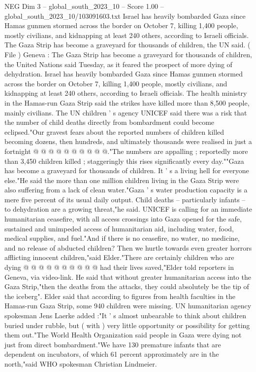 \begin{textsample}{NEG Dim 3 – global\_south\_2023\_10 – Score 1.00 – global\_south\_2023\_10/103091603.txt}  \label{ex:f3_neg_025}
Israel has heavily bombarded Gaza since Hamas gunmen stormed across the border on October 7, killing 1,400 people, mostly civilians, and kidnapping at least 240 others, according to Israeli officials.
The Gaza Strip has become a graveyard for thousands of children, the UN said. ( File ) Geneva : The Gaza Strip has become a graveyard for thousands of children, the United Nations said Tuesday, as it feared the prospect of more dying of dehydration.
Israel has heavily bombarded Gaza since Hamas gunmen stormed across the border on October 7, killing 1,400 people, mostly civilians, and kidnapping at least 240 others, according to Israeli officials.
The health ministry in the Hamas-run Gaza Strip said the strikes have killed more than 8,500 people, mainly civilians.
The UN children ' s agency UNICEF said there was a risk that the number of child deaths directly from bombardment could become eclipsed."Our gravest fears about the reported numbers of children killed becoming dozens, then hundreds, and ultimately thousands were realised in just a fortnight @ @ @ @ @ @ @ @ @ @."The numbers are appalling ; reportedly more than 3,450 children killed ; staggeringly this rises significantly every day.""Gaza has become a graveyard for thousands of children.
It ' s a living hell for everyone else."He said the more than one million children living in the Gaza Strip were also suffering from a lack of clean water."Gaza ' s water production capacity is a mere five percent of its usual daily output.
Child deaths -- particularly infants -- to dehydration are a growing threat,"he said.
UNICEF is calling for an immediate humanitarian ceasefire, with all access crossings into Gaza opened for the safe, sustained and unimpeded access of humanitarian aid, including water, food, medical supplies, and fuel."And if there is no ceasefire, no water, no medicine, and no release of abducted children?
Then we hurtle towards even greater horrors afflicting innocent children,"said Elder."There are certainly children who are dying @ @ @ @ @ @ @ @ @ @ had their lives saved,"Elder told reporters in Geneva, via video-link.
He said that without greater humanitarian access into the Gaza Strip,"then the deaths from the attacks, they could absolutely be the tip of the iceberg".
Elder said that according to figures from health faculties in the Hamas-run Gaza Strip, some 940 children were missing.
UN humanitarian agency spokesman Jens Laerke added :"It ' s almost unbearable to think about children buried under rubble, but ( with ) very little opportunity or possibility for getting them out."The World Health Organization said people in Gaza were dying not just from direct bombardment."We have 130 premature infants that are dependent on incubators, of which 61 percent approximately are in the north,"said WHO spokesman Christian Lindmeier.

\end{textsample}
